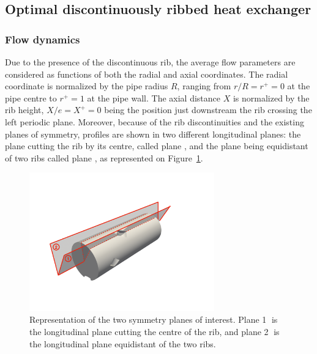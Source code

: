 \subsection{Optimal discontinuously ribbed heat exchanger}
\label{sec:optimal}
\subsubsection{Flow dynamics}

Due to the presence of the discontinuous rib, the average flow parameters are considered as functions of both the radial and axial coordinates. The radial coordinate is normalized by the pipe radius $R$, ranging from $r/R=r^+=0$ at the pipe centre to $r^+=1$ at the pipe wall. The axial distance $X$ is normalized by the rib height, $X/e=X^+=0$ being the position just downstream the rib crossing the left periodic plane. Moreover, because of the rib discontinuities and the existing planes of symmetry, profiles are shown in two different longitudinal planes: the plane cutting the rib by its centre, called plane , and the plane being equidistant of two ribs called plane , as represented on Figure~\ref{planes}.\\

\begin{figure}[h]
\centering
\includegraphics[width=8cm]{fig/applications/optim/PlaneS.pdf}
\caption{Representation of the two symmetry planes of interest. Plane \textcircled{1} is the longitudinal plane cutting the centre of the rib, and plane \textcircled{2} is the longitudinal plane equidistant of the two ribs.}
\label{planes}
\end{figure}

